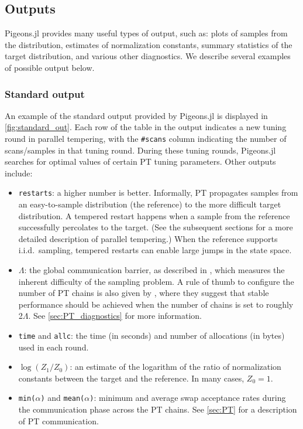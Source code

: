 \subsection{Outputs}
Pigeons.jl provides many useful types of output, such as: plots of samples from 
the distribution, estimates of normalization constants, summary statistics of 
the target distribution, and various other diagnostics. 
We describe several examples of possible output below.


\subsubsection{Standard output}
An example of the standard output provided by Pigeons.jl is displayed in \cref{fig:standard_out}. 
Each row of the table in the output indicates a new tuning round in parallel tempering, 
with the \texttt{\#scans} column indicating the number of scans/samples in 
that tuning round. 
During these tuning rounds, Pigeons.jl searches for optimal values of certain PT 
tuning parameters. Other outputs include: 
\begin{itemize}
    \item \texttt{restarts}: a higher number is better. 
    Informally, PT propagates samples from an easy-to-sample distribution (the reference) 
    to the more difficult target distribution. 
    A tempered restart happens when a sample from the reference successfully 
    percolates to the target. (See the subsequent sections for a more detailed description 
    of parallel tempering.) 
    When the reference supports i.i.d.~sampling, tempered restarts 
    can enable large jumps in the state space. 

    \item \texttt{$\Lambda$}: the global communication barrier, as described in \cite{syed2021nrpt}, 
    which measures the inherent difficulty of the sampling problem.
    A rule of thumb to configure the number of PT chains is also 
    given by \cite{syed2021nrpt}, where they suggest that stable performance 
    should be achieved when the number of chains is set to roughly 2$\Lambda$.
    See \cref{sec:PT_diagnostics} for more information.

    \item \texttt{time} and \texttt{allc}: the time (in seconds) and number of 
    allocations (in bytes) used in each round.

    \item \texttt{$\log(Z_1/Z_0)$}: an estimate of the 
    logarithm of the ratio of normalization constants between the target and the reference. 
    In many cases, $Z_0 = 1$.

    \item \texttt{min($\alpha$)} and \texttt{mean($\alpha$)}: minimum and average swap 
    acceptance rates during the communication phase across the PT chains.
    See \cref{sec:PT} for a description of PT communication.
\end{itemize}


